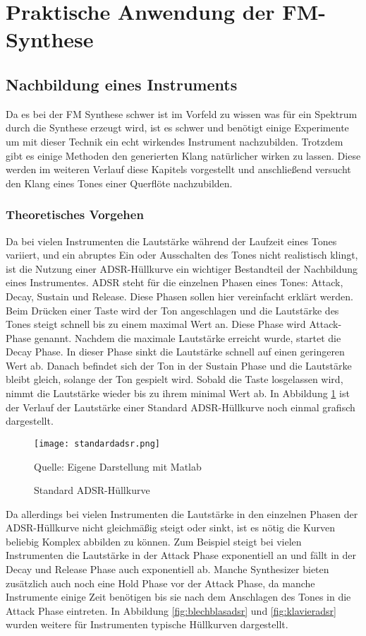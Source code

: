 \section{Praktische Anwendung der FM-Synthese}
\FloatBarrier
\subsection{Nachbildung eines Instruments}
Da es bei der FM Synthese schwer ist im Vorfeld zu wissen was für ein Spektrum durch die Synthese erzeugt wird, ist es schwer und benötigt einige Experimente um mit dieser Technik ein echt wirkendes Instrument nachzubilden.
Trotzdem gibt es einige Methoden den generierten Klang natürlicher wirken zu lassen. Diese werden im weiteren Verlauf diese Kapitels vorgestellt und anschließend versucht den Klang eines Tones einer Querflöte nachzubilden.

\FloatBarrier
\subsubsection{Theoretisches Vorgehen}

Da bei vielen Instrumenten die Lautstärke während der Laufzeit eines Tones variiert, und ein abruptes Ein oder Ausschalten des Tones nicht realistisch klingt, ist die Nutzung einer ADSR-Hüllkurve ein wichtiger Bestandteil der Nachbildung eines Instrumentes. ADSR steht für die einzelnen Phasen eines Tones: Attack, Decay, Sustain und Release. Diese Phasen sollen hier vereinfacht erklärt werden. Beim Drücken einer Taste wird der Ton angeschlagen und die Lautstärke des Tones steigt schnell bis zu einem maximal Wert an. Diese Phase wird Attack-Phase genannt. Nachdem die maximale Lautstärke erreicht wurde, startet die Decay Phase. In dieser Phase sinkt die Lautstärke schnell auf einen geringeren Wert ab. Danach befindet sich der Ton in der Sustain Phase und die Lautstärke bleibt gleich, solange der Ton gespielt wird. Sobald die Taste losgelassen wird, nimmt die Lautstärke wieder bis zu ihrem minimal Wert ab. In Abbildung \ref{fig:defaultADSR} ist der Verlauf der Lautstärke einer Standard ADSR-Hüllkurve noch einmal grafisch dargestellt.

\begin{figure} [ht]
\centering
  \texttt{[image: standardadsr.png]}
\caption{Standard ADSR-Hüllkurve}
\label{fig:defaultADSR}
Quelle: Eigene Darstellung mit Matlab
\end{figure}

Da allerdings bei vielen Instrumenten die Lautstärke in den einzelnen Phasen der ADSR-Hüllkurve nicht gleichmäßig steigt oder sinkt, ist es nötig die Kurven beliebig Komplex abbilden zu können. Zum Beispiel steigt bei vielen Instrumenten die Lautstärke in der Attack Phase exponentiell an und fällt in der Decay und Release Phase auch exponentiell ab. Manche Synthesizer bieten zusätzlich auch noch eine Hold Phase vor der Attack Phase, da manche Instrumente einige Zeit benötigen bis sie nach dem Anschlagen des Tones in die Attack Phase eintreten. In Abbildung \ref{fig:blechblasadsr} und \ref{fig:klavieradsr} wurden weitere für Instrumenten typische Hüllkurven dargestellt.


